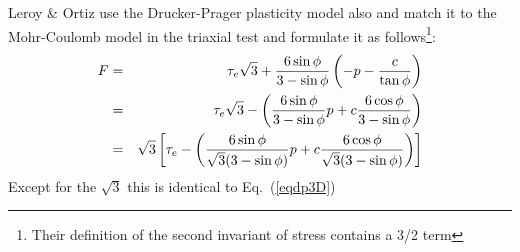 \vspace{1.3cm}
Leroy \& Ortiz \cite{leor89} use the Drucker-Prager plasticity model also and match it to the Mohr-Coulomb model in the 
triaxial test and formulate it as follows\footnote{Their definition of the second invariant of stress contains a 3/2 term}:
\begin{eqnarray}
F 
&=& \tau_e \sqrt{3} + \frac{6 \sin\phi}{3-\sin\phi} \left( -p  - \frac{c}{\tan \phi} \right) \nonumber\\
&=& \tau_e \sqrt{3} - \left( \frac{6 \sin\phi}{3-\sin\phi}  p  + c \frac{6 \cos\phi}{3-\sin\phi} \right) \nonumber\\
&=& \sqrt{3} \left[ \tau_e  - \left( \frac{6 \sin\phi}{\sqrt{3}(3-\sin\phi)}  p  + c \frac{6 \cos\phi}{\sqrt{3}(3-\sin\phi)} \right)  \right]
\end{eqnarray}
Except for the $\sqrt{3}$ this is identical to Eq.~(\ref{eqdp3D})


